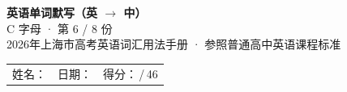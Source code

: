 \documentclass[10pt,a4paper]{article}
\begin{document}
\pagestyle{plain}

\begin{center}
{\LARGE\bfseries 英语单词默写（英 $\to$ 中）}\\[0.22em]
{\large C 字母 · 第 6 / 8 份}\\[0.18em]
{\small 2026年上海市高考英语词汇用法手册 · 参照普通高中英语课程标准}
\end{center}

\vspace{0.25em}
\noindent\begin{tabular}{@{}p{}@{}p{}@{}p{}@{}}
姓名：\underline{\hspace{2.0cm}} & 日期：\underline{\hspace{2.0cm}} & 得分：\underline{\hspace{1.3cm}}\,/\,46 \\
\end{tabular}

\vspace{0.3em}

\vspace{0.08em}
\end{document}
